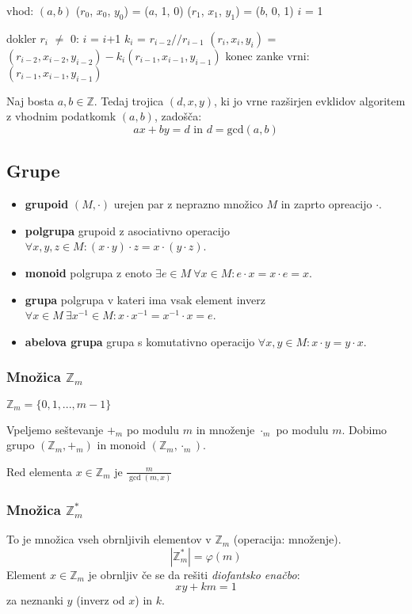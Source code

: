 \begin{multicols}{5}
\begin{koda}
vhod: $(a, b)$
($r_0$, $x_0$, $y_0$) = ($a$, 1, 0)
($r_1$, $x_1$, $y_1$) = ($b$, 0, 1)
$i$ = 1

dokler $r_i$ $\neq$ 0:
    $i$ = $i$+1
    $k_i$ = $r_{i-2} // r_{i-1}$
    $(r_i, x_i, y_i)$ = $(r_{i-2}, x_{i-2}, y_{i-2}) - k_i(r_{i-1}, x_{i-1}, y_{i-1})$
konec zanke
vrni: $(r_{i-1}, x_{i-1}, y_{i-1})$
\end{koda}

Naj bosta $a, b \in \mathbb{Z}$. Tedaj trojica $(d, x, y)$, ki jo vrne razširjen evklidov algoritem z vhodnim podatkomk $(a, b)$, zadošča:
\[ax + by = d \text{ in } d = \textrm{gcd}(a, b)\] 


\subsection*{Grupe}
\begin{itemize}
    \item \textbf{grupoid} $(M, \cdot)$ urejen par z neprazno množico $M$ in zaprto opreacijo $\cdot$.
    \item \textbf{polgrupa} grupoid z asociativno operacijo $ \forall x,y,z \in M : (x\cdot y)\cdot z = x\cdot (y\cdot z)$.
    \item \textbf{monoid} polgrupa z enoto $ \exists e \in M \ \forall x \in M : e\cdot x = x\cdot e = x$.
    \item \textbf{grupa} polgrupa v kateri ima vsak element inverz $ \forall x \in M \ \exists x^{-1} \in M : x\cdot x^{-1} = x^{-1}\cdot x = e$.
    \item \textbf{abelova grupa} grupa s komutativno operacijo $ \forall x,y \in M  : x\cdot y = y\cdot x$.
\end{itemize} 

\subsubsection{Množica $\mathbb{Z}_m$}
$\mathbb{Z}_m = \{0,1,...,m-1\}$

Vpeljemo seštevanje $+_m$ po modulu $m$ in množenje $\cdot_m$ po modulu $m$. 
Dobimo grupo $(\mathbb{Z}_m, +_m)$ in monoid $(\mathbb{Z}_m, \cdot_m)$.

Red elementa $x\in \mathbb{Z}_m$ je $\frac{m}{\gcd(m,x)}$

\subsubsection{Množica $\mathbb{Z}_m^*$}
To je množica vseh obrnljivih elementov v $\mathbb{Z}_m$ (operacija: množenje).
\[|\mathbb{Z}^*_m| = \varphi(m)\]
Element $x\in \mathbb{Z}_m$ je obrnljiv če se da rešiti \emph{diofantsko enačbo}:
\[ xy + km = 1\]
za neznanki $y$ (inverz od $x$) in $k$.


\end{multicols}
